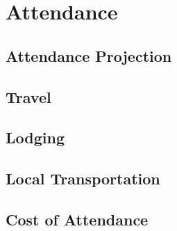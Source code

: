 \section{Attendance}

\subsection{Attendance Projection}


\subsection{Travel}


\subsection{Lodging}


\subsection{Local Transportation}


\subsection{Cost of Attendance}

